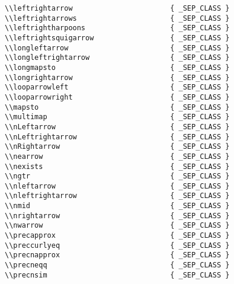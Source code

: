 \begin{verbatim}
\\leftrightarrow                       { _SEP_CLASS }
\\leftrightarrows                      { _SEP_CLASS }
\\leftrightharpoons                    { _SEP_CLASS }
\\leftrightsquigarrow                  { _SEP_CLASS }
\\longleftarrow                        { _SEP_CLASS }
\\longleftrightarrow                   { _SEP_CLASS }
\\longmapsto                           { _SEP_CLASS }
\\longrightarrow                       { _SEP_CLASS }
\\looparrowleft                        { _SEP_CLASS }
\\looparrowright                       { _SEP_CLASS }
\\mapsto                               { _SEP_CLASS }
\\multimap                             { _SEP_CLASS }
\\nLeftarrow                           { _SEP_CLASS }
\\nLeftrightarrow                      { _SEP_CLASS }
\\nRightarrow                          { _SEP_CLASS }
\\nearrow                              { _SEP_CLASS }
\\nexists                              { _SEP_CLASS }
\\ngtr                                 { _SEP_CLASS }
\\nleftarrow                           { _SEP_CLASS }
\\nleftrightarrow                      { _SEP_CLASS }
\\nmid                                 { _SEP_CLASS }
\\nrightarrow                          { _SEP_CLASS }
\\nwarrow                              { _SEP_CLASS }
\\precapprox                           { _SEP_CLASS }
\\preccurlyeq                          { _SEP_CLASS }
\\precnapprox                          { _SEP_CLASS }
\\precneqq                             { _SEP_CLASS }
\\precnsim                             { _SEP_CLASS }

\end{verbatim}
